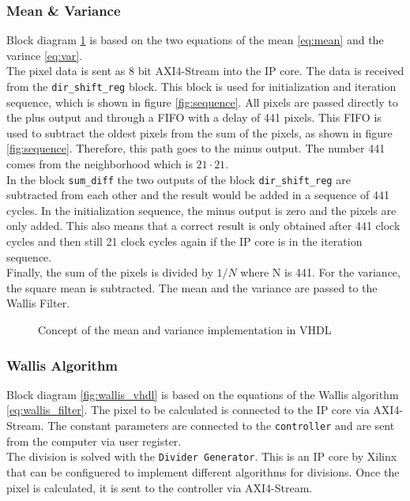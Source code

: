 \subsubsection*{Mean \& Variance}
Block diagram \ref{fig:mean_var_vhdl} is based on the two equations of the mean \ref{eq:mean} and the varince \ref{eq:var}. \\
The pixel data is sent as 8 bit AXI4-Stream into the IP core. The data is
received from the \texttt{dir\_shift\_reg} block. This block is used for
initialization and iteration sequence, which is shown in figure 
\ref{fig:sequence}. All pixels are passed directly to the plus output and
through a FIFO with a delay of 441 pixels. This FIFO is used to subtract the
oldest pixels from the sum of the pixels, as shown in figure \ref{fig:sequence}. Therefore, this path goes to the minus output. The number 441 comes from the neighborhood which is $21 \cdot 21$. \\
In the block \texttt{sum\_diff} the two outputs of the block \texttt{dir\_shift\_reg} are subtracted from each other and the result would be added in a sequence of 441 cycles. In the initialization sequence, the minus output is zero and the pixels are only added. This also means that a correct result is only obtained after 441 clock cycles and then still 21 clock cycles again if the IP core is in the iteration sequence. \\
Finally, the sum of the pixels is divided by $1/N$ where N is 441. For the variance, the square mean is subtracted. The mean and the variance are passed to the Wallis Filter.
\begin{figure}[tb!]
    \centering
    \begin{adjustbox}{max width=\textwidth, keepaspectratio}
        
    \end{adjustbox}
    \caption{Concept of the mean and variance implementation in VHDL}
    \label{fig:mean_var_vhdl}
\end{figure}

\subsubsection*{Wallis Algorithm}
Block diagram \ref{fig:wallis_vhdl} is based on the equations of the Wallis algorithm \ref{eq:wallis_filter}.
The pixel to be calculated is connected to the IP core via AXI4-Stream. The constant parameters are connected to the \texttt{controller} and are sent from the computer via user register. \\
The division is solved with the \texttt{Divider Generator}. This is an IP core
by Xilinx that can be configuered to implement different algorithms for
divisions. Once the pixel is calculated, it is sent to the controller via AXI4-Stream.

